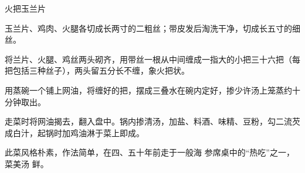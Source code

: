\begin{recipe}{火把玉兰片}

\ingredients


\cooking

\step 玉兰片、鸡肉、火腿各切成长两寸的二粗丝；带皮发后淘洗干净，切成长五寸的细
丝。

\step 将兰片、火腿、鸡丝两头砌齐，用带丝一根从中间缠成一指大的小把三十六把（每
把包括三种丝子），两头留五分长不缠，象火把状。

\step 用蒸碗一个铺上网油，将缠好的把，摆成三叠水在碗内定好，掺少许汤上笼蒸约十
分钟取出。

\step 走菜时将网油揭去，翻入盘中。锅内掺清汤，加盐、料酒、味精、豆粉，勾二流芡
成白汁，起锅时加鸡油淋于菜上即成。

\features

此菜风格朴素，作法简单，在四、五十年前走于一般海 参席桌中的“热吃”之一，菜美汤
鲜。

\end{recipe}

